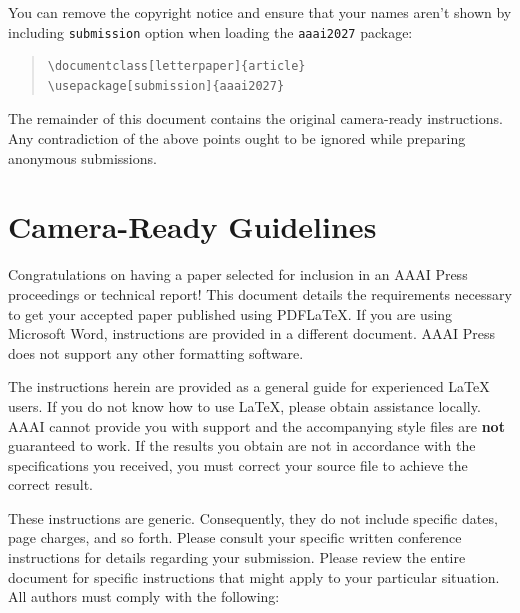 \documentclass[letterpaper]{article} %
\begin{document}
You can remove the copyright notice and ensure that your names aren't shown by including \texttt{submission} option when loading the \texttt{aaai2027} package:

\begin{quote}\begin{scriptsize}\begin{verbatim}
\documentclass[letterpaper]{article}
\usepackage[submission]{aaai2027}
\end{verbatim}\end{scriptsize}\end{quote}

The remainder of this document contains the original camera-ready instructions. Any contradiction of the above points ought to be ignored while preparing anonymous submissions.

\section{Camera-Ready Guidelines}

Congratulations on having a paper selected for inclusion in an AAAI Press proceedings or technical report! This document details the requirements necessary to get your accepted paper published using PDF\LaTeX{}. If you are using Microsoft Word, instructions are provided in a different document. AAAI Press does not support any other formatting software.

The instructions herein are provided as a general guide for experienced \LaTeX{} users. If you do not know how to use \LaTeX{}, please obtain assistance locally. AAAI cannot provide you with support and the accompanying style files are \textbf{not} guaranteed to work. If the results you obtain are not in accordance with the specifications you received, you must correct your source file to achieve the correct result.

These instructions are generic. Consequently, they do not include specific dates, page charges, and so forth. Please consult your specific written conference instructions for details regarding your submission. Please review the entire document for specific instructions that might apply to your particular situation. All authors must comply with the following:
\end{document}

